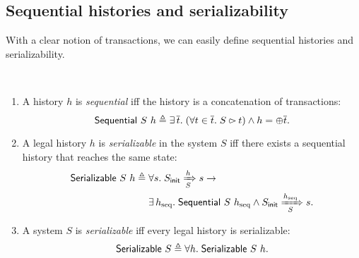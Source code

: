 \subsection{Sequential histories and serializability}
\label{sec-seq-sz}

With a clear notion of transactions, we can easily define sequential histories and serializability.

\begin{definition}\mbox{}\vspace{-8pt}\\
  \begin{enumerate}[leftmargin=*]
  \item A history $h$ is \emph{sequential} iff the history is a concatenation of transactions:
    \begin{displaymath}
      \mathsf{Sequential}\ S\ h \triangleq \exists\, \overline{t}.\; (\forall t \in \overline{t}.\; S \rightslice t) \wedge h = \oplus \overline{t}.
    \end{displaymath}
  \item A legal history $h$ is \emph{serializable} in the system $S$ iff there exists a sequential history that reaches the same state:
    \begin{align*}
      \mathsf{Serializable}\ S\ h \triangleq\; & \forall s.\; S_{\textsf{init}} \xRightarrow[S]{h} s \to\\
      & \exists\, h_{\textrm{seq}}.\; \mathsf{Sequential}\ S\ h_{\textrm{seq}} \wedge S_{\textsf{init}} \xRightarrow[S]{h_{\textrm{seq}}} s.
    \end{align*}
  \item A system $S$ is \emph{serializable} iff every legal history is serializable:
    \begin{displaymath}
      \mathsf{Serializable}\ S \triangleq \forall h.\; \mathsf{Serializable}\ S\ h.
    \end{displaymath}
  \end{enumerate}
  \label{def-sz}
\end{definition}

